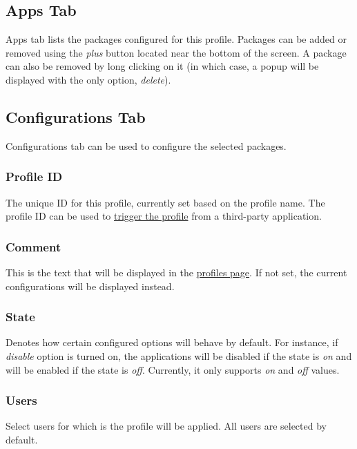 \subsection{Apps Tab}\label{subsec:profile-apps-tab} %
Apps tab lists the packages configured for this profile. Packages can be added or removed using the
\textit{plus} button located near the bottom of the screen. A package can also be removed by long
clicking on it (in which case, a popup will be displayed with the only option, \textit{delete}).

\subsection{Configurations Tab}\label{subsec:profile-configurations-tab} %
Configurations tab can be used to configure the selected packages.

\subsubsection{Profile ID} %
The unique ID for this profile, currently set based on the profile name. The profile ID can be used
to \hyperref[subsec:triggering-a-profile]{trigger the profile} from a third-party application.

\subsubsection{Comment} %
This is the text that will be displayed in the \hyperref[sec:profiles-page]{profiles page}. If not set, the current
configurations will be displayed instead.

\subsubsection{State}\label{subsubsec:profile-state} %
Denotes how certain configured options will behave by default. For instance, if \textit{disable} option is turned on,
the applications will be disabled if the state is \textit{on} and will be enabled if the state is \textit{off}.
Currently, it only supports \textit{on} and \textit{off} values.

\subsubsection{Users} %
Select users for which is the profile will be applied. All users are selected by default.


